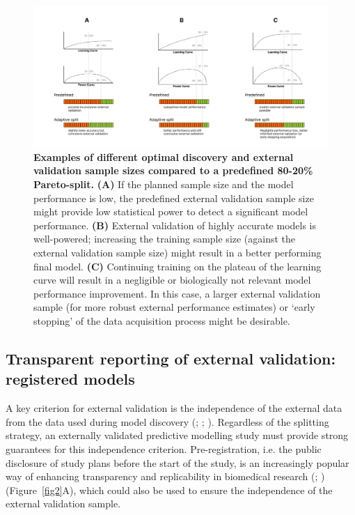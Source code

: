 \documentclass{article}
\begin{document}
\begin{figure}[!htbp]
\centering
\includegraphics[width=0.7\linewidth]{files/fig1-5b829e24d45e222827ddbc25fe988474.png}
\caption[]{\textbf{Examples of different optimal discovery and external validation sample sizes compared to a predefined 80-20\% Pareto-split.} \newline
\textbf{(A)} If the planned sample size and the model performance is low, the predefined external validation sample size might provide low statistical power to detect a significant model performance. \textbf{(B)} External validation of highly accurate models is well-powered; increasing the training sample size (against the external validation sample size) might result in a better performing final model. \textbf{(C)} Continuing training on the plateau of the learning curve will result in a negligible or biologically not relevant model performance improvement.
In this case, a larger external validation sample (for more robust external performance estimates) or `early stopping' of the data acquisition process might be desirable.}
\label{fig1}
\end{figure}

\subsection{Transparent reporting of external validation: registered models}

A key criterion for external validation is the independence of the external data from the data used during model discovery (\cite{Steyerberg_2016}; \cite{Collins_2014}; \cite{Spisak_2023}). Regardless of the splitting strategy, an externally validated predictive modelling study must provide strong guarantees for this independence criterion.
Pre-registration, i.e. the public disclosure of study plans before the start of the study, is an increasingly popular way of enhancing transparency and replicability in biomedical research (\cite{Nosek_2019}; \cite{Spisak_2023}) (Figure~\ref{fig2}A), which could also be used to ensure the independence of the external validation sample.
\end{document}
